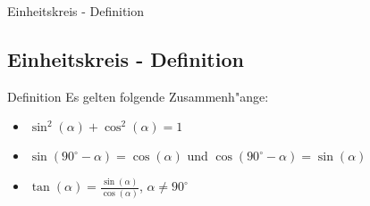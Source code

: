 \documentclass{standalone}
\begin{document}
\begin{frame}
  \begin{center}
    Einheitskreis - Definition
  \end{center}
  \subsection{Einheitskreis - Definition}
\end{frame}

\begin{frame}{Definition}
  Es gelten folgende Zusammenh{"a}nge:\\
  \begin{itemize}
    \item <2-> $\sin^2(\alpha) + \cos^2(\alpha) = 1$
    \item <3-> $\sin(90^\circ - \alpha) = \cos(\alpha)$ und $\cos(90^\circ - \alpha) = \sin(\alpha)$
    \item <4-> $\tan(\alpha) = \frac{\sin(\alpha)}{\cos(\alpha)}$, $\alpha \neq 90^\circ$
  \end{itemize}
\end{frame}
\end{document}

